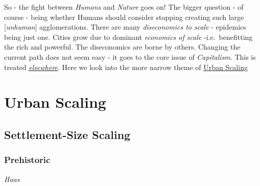 \documentclass[
]{book}
\begin{document}
So - the fight between \emph{Humans} and \emph{Nature} goes on!
The bigger question - of course - being whether Humans should consider stopping creating such
large {[}\emph{unhuman}{]} agglomerations. There are many \emph{diseconomics to scale} - epidemics being just one.
Cities grow due to dominant \emph{economics of scale} -i.e.~benefitting the rich and powerful.
The diseconomics are borne by others. Changing the current path does not seem easy -
it goes to the core issue of \emph{Capitalism}. This is treated \href{https://dyrehaugen.github.io/jdt/cap_urbanisation.html\#the-urban-dimension}{\emph{elsewhere}}.
Here we look into the more narrow theme of
\href{/docs/03-urban-scaling}{Urban Scaling}

\hypertarget{urban-scaling}{%
\chapter{Urban Scaling}\label{urban-scaling}}

\hypertarget{settlement-size-scaling}{%
\section{Settlement-Size Scaling}\label{settlement-size-scaling}}

\hypertarget{prehistoric}{%
\subsection{Prehistoric}\label{prehistoric}}

\emph{Haas}
\end{document}
